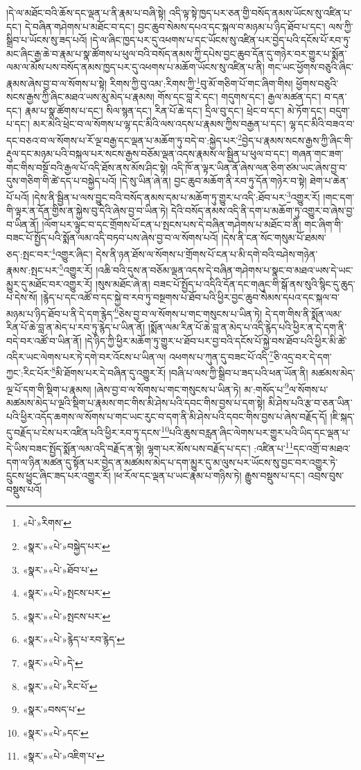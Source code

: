 །དེ་ལ་མཐོང་བའི་ཆོས་དང་ལྡན་པ་ནི་རྣམ་པ་བཞི་སྟེ། འདི་ལྟ་སྟེ་ཁྱད་པར་ཅན་གྱི་བསོད་ནམས་ཡོངས་སུ་འཛིན་པ་དང་། དེ་བཞིན་གཤེགས་པ་མཐོང་བ་དང་། བྱང་ཆུབ་སེམས་དཔའ་དང་སྐལ་བ་མཉམ་པ་ཉིད་ཐོབ་པ་དང་། ལས་ཀྱི་སྒྲིབ་པ་ཡོངས་སུ་ཟད་པའོ། །དེ་ལ་ཞིང་ཁྱད་པར་དུ་འཕགས་པ་དང་ཡོངས་སུ་འཛིན་པར་བྱེད་པའི་དངོས་པོ་རབ་ཏུ་མང་ཞིང་རྒྱ་ཆེ་བ་རྣམ་པ་སྣ་ཚོགས་པ་ཕུལ་བའི་བསོད་ནམས་ཀྱི་དཔེས་བྱང་ཆུབ་དོན་དུ་གཉེར་བར་གྱུར་པ་སྨོན་ལམ་ལ་མོས་པས་བསོད་ནམས་ཁྱད་པར་དུ་འཕགས་པ་མཆོག་ཡོངས་སུ་འཛིན་པ་ནི། གང་ཡང་ཕྱོགས་བཅུའི་ཞིང་རྣམས་ཞེས་བྱ་བ་ལ་སོགས་པ་སྟེ། རིགས་ཀྱི་བུ་འམ་:རིགས་ཀྱི་\footnote{«པེ་»རིགས་}བུ་མོ་གཅིག་པོ་གང་ཞིག་གིས། ཕྱོགས་བཅུའི་སངས་རྒྱས་ཀྱི་ཞིང་མཐའ་ཡས་མུ་མེད་པ་རྣམས། གོས་དང་བླ་རེ་དང་། གདུགས་དང་། རྒྱལ་མཚན་དང་། བ་དན་དང་། རྣམ་པ་སྣ་ཚོགས་པ་དང་། སིལ་སྙན་དང་། རིན་པོ་ཆེ་དང་། དྲིལ་བུ་དང་། ཕྲེང་བ་དང་། མེ་ཏོག་དང་། བདུག་པ་དང་། མར་མེའི་ཕྲེང་བ་ལ་སོགས་པ་ལྷ་དང་མིའི་ལས་འདས་པ་རྣམས་ཀྱིས་བརྒྱན་པ་དང་། ལྷ་དང་མིའི་བཟའ་བ་དང་བཅའ་བ་ལ་སོགས་པ་རོ་ལྔ་བརྒྱ་དང་ལྡན་པ་མཆོག་ཏུ་བདེ་བ་:སྐྱེད་པར་\footnote{«སྣར་»«པེ་»བསྐྱེད་པར་}བྱེད་པ་རྣམས་སངས་རྒྱས་ཀྱི་ཞིང་གི་རྡུལ་དང་མཉམ་པའི་བསྐལ་པར་སངས་རྒྱས་བཅོམ་ལྡན་འདས་རྣམས་ལ་སྦྱིན་པ་ཕུལ་བ་དང་། གཞན་གང་ཟག་གང་གིས་བསྔོ་བའི་རྒྱལ་པོ་འདི་ཐོས་ནས་མོས་ཤིང་སྟེ། འདི་ཁོ་ན་ལྟར་ཡིན་ནོ་ཞེས་ལན་ཅིག་ཙམ་ཡང་ཞེས་བྱ་བ་དུས་གཅིག་གི་ཚེ་དད་པ་བསྐྱེད་པའོ། །དེ་སུ་ཡིན་ཞེ་ན། བྱང་ཆུབ་མཆོག་ནི་རབ་ཏུ་དོན་གཉེར་བ་སྟེ། ཐེག་པ་ཆེན་པོ་པའོ། །དེས་ནི་སྦྱིན་པ་ལས་བྱུང་བའི་བསོད་ནམས་དམ་པ་མཆོག་ཏུ་གྱུར་པ་འདི་:ཐོབ་པར་\footnote{«སྣར་»«པེ་»ཐོབ་པ་}འགྱུར་རོ། །གང་དག་གི་ལྟར་ན་དོན་གྱིས་ན་སྐྱེས་བུ་དེའི་ཞེས་བྱ་བ་ཡིན་ཏེ། དེའི་བསོད་ནམས་འདི་ནི་དག་པ་མཆོག་ཏུ་འགྱུར་བ་ཞེས་བྱ་བ་ཡིན་ནོ། །ལོག་པར་ལྟུང་བ་དང་གྲོགས་པོ་ངན་པ་སྤངས་པས་དེ་བཞིན་གཤེགས་པ་མཐོང་བ་ནི། གང་ཞིག་གི་བཟང་པོ་སྤྱོད་པའི་སྨོན་ལམ་འདི་བཏབ་པས་ཞེས་བྱ་བ་ལ་སོགས་པའོ། །དེས་ནི་ངན་སོང་གསུམ་པོ་ཐམས་ཅད་:སྤང་བར་\footnote{«སྣར་»«པེ་»སྤངས་པར་}འགྱུར་ཞིང་། དེས་ནི་ཉན་ཐོས་ལ་སོགས་པ་གྲོགས་པོ་ངན་པ་མི་དགེ་བའི་བཤེས་གཉེན་རྣམས་:སྤང་པར་\footnote{«སྣར་»«པེ་»སྤངས་པར་}འགྱུར་རོ། །འཆི་བའི་དུས་ན་བཅོམ་ལྡན་འདས་དེ་བཞིན་གཤེགས་པ་སྣང་བ་མཐའ་ཡས་དེ་ཡང་མྱུར་དུ་མཐོང་བར་འགྱུར་རོ། །སུས་མཐོང་ཞེ་ན། བཟང་པོ་སྤྱོད་པ་འདིའི་དོན་དང་གཞུང་གི་སྒོ་ནས་སུའི་སྙིང་དུ་ཆུད་པ་དེས་སོ། །རྙེད་པ་དང་འཚོ་བ་དང་སྐྱེ་བ་རབ་ཏུ་བསྔགས་པ་ཐོབ་པའི་ཕྱིར་བྱང་ཆུབ་སེམས་དཔའ་དང་སྐལ་བ་མཉམ་པ་ཉིད་ཐོབ་པ་ནི་དེ་དག་རྙེད་\footnote{«སྣར་»«པེ་»རྙེད་པ་རབ་རྙེད་}ཅེས་བྱ་བ་ལ་སོགས་པ་གང་གསུངས་པ་ཡིན་ཏེ། དེ་དག་གིས་ནི་སྨོན་ལམ་རིན་པོ་ཆེ་བླ་ན་མེད་པ་རབ་ཏུ་རྙེད་པ་ཡིན་ནོ། །སྨོན་ལམ་རིན་པོ་ཆེ་བླ་ན་མེད་པ་འདི་རྙེད་པའི་ཕྱིར་ན་དེ་དག་ནི་བདེ་བར་འཚོ་བ་ཡིན་ནོ། །དེ་ཉིད་ཀྱི་ཕྱིར་མཆོག་ཏུ་གྱུར་པ་ཐོབ་པར་བྱ་བའི་དངོས་པོ་སྐྱེ་བས་ཐོབ་པའི་ཕྱིར་མི་ཚེ་འདིར་ཡང་ལེགས་པར་ཏེ་དགེ་བར་འོངས་པ་ཡིན་ལ། འཕགས་པ་ཀུན་དུ་བཟང་པོ་འདི་\footnote{«སྣར་»«པེ་»དེ་}ཅི་འདྲ་བར་དེ་དག་ཀྱང་:རིང་པོར་\footnote{«སྣར་»«པེ་»རིང་པོ་}མི་ཐོགས་པར་དེ་བཞིན་དུ་འགྱུར་རོ། །བཞི་པ་ལས་ཀྱི་སྒྲིབ་པ་ཟད་པའི་ཕན་ཡོན་ནི། མཚམས་མེད་ལྔ་པོ་དག་གི་སྡིག་པ་རྣམས། །ཞེས་བྱ་བ་ལ་སོགས་པ་གང་གསུངས་པ་ཡིན་ཏེ། མ་:གསོད་པ་\footnote{«སྣར་»བསད་པ་}ལ་སོགས་པ་མཚམས་མེད་པ་ལྔའི་སྡིག་པ་རྣམས་གང་གིས་མི་ཤེས་པའི་དབང་གིས་བྱས་པ་དག་སྟེ། མི་ཤེས་པའི་རྩ་བ་ཅན་ཡིན་པའི་ཕྱིར་འདོད་ཆགས་ལ་སོགས་པ་གང་ཡང་རུང་བ་དག་ནི་མི་ཤེས་པའི་དབང་གིས་བྱས་པ་ཞེས་བརྗོད་དོ། །ཇི་སྐད་དུ་བརྗོད་པ་ངེས་པར་འཛིན་པའི་ཕྱིར་རབ་ཏུ་དངས་\footnote{«སྣར་»«པེ་»དང་}པའི་ཆུས་བརླན་ཞིང་ལེགས་པར་གྱུར་པའི་ཡིད་དང་ལྡན་པ་དེ་ཡིས་བཟང་སྤྱོད་སྨོན་ལམ་འདི་བརྗོད་ན་སྟེ། ལྷག་པར་མོས་པས་བརྗོད་པ་དང་། :འཛིན་པ་\footnote{«སྣར་»«པེ་»འཇིག་པ་}དང་འགྲོ་བ་མཐའ་དག་ལ་ཉིན་མཚན་དུ་སྟོན་པར་བྱེད་ན་མཚམས་མེད་པ་དག་མྱུར་དུ་མ་ལུས་པར་ཡོངས་སུ་བྱང་བར་འགྱུར་ཏེ་དྲུངས་ཕྱུང་ཞིང་ཟད་པར་འགྱུར་རོ། །ཕ་རོལ་དང་ལྡན་པ་ཡང་རྣམ་པ་གཉིས་ཏེ། རྒྱུས་བསྡུས་པ་དང་། འབྲས་བུས་བསྡུས་པའོ། 
